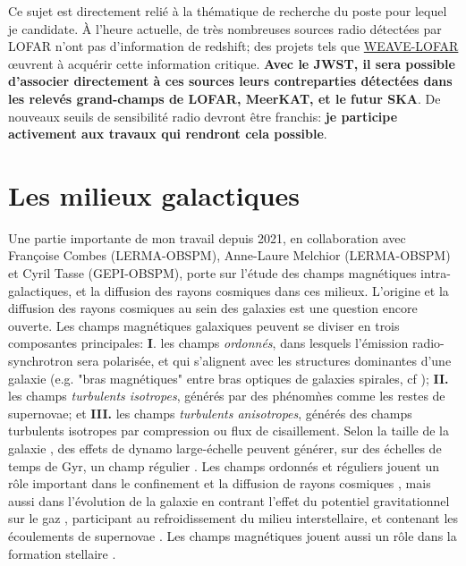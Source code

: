 \begin{tcolorbox}[colback=green!20, colframe=green!50!black, arc=3mm, boxrule=2pt]
	Ce sujet est directement reli\'e \`a la th\'ematique de recherche du poste pour lequel je candidate. \`A l'heure actuelle, de tr\`es nombreuses sources radio d\'etect\'ees par LOFAR n'ont pas d'information de redshift; des projets tels que \href{https://ingconfluence.ing.iac.es/confluence/display/WEAV/WEAVE-LOFAR}{WEAVE-LOFAR} {\oe}uvrent \`a acqu\'erir cette information critique. \textbf{Avec le JWST, il sera possible d'associer directement \`a ces sources leurs contreparties d\'etect\'ees dans les relev\'es grand-champs de LOFAR, MeerKAT, et le futur SKA}. De nouveaux seuils de sensibilit\'e radio devront \^etre franchis: \textbf{je participe activement aux travaux qui rendront cela possible}.
\end{tcolorbox}




\newpage







\section{Les milieux galactiques}

\pg
Une partie importante de mon travail depuis 2021, en collaboration avec Fran\c{c}oise Combes (LERMA-OBSPM), Anne-Laure Melchior (LERMA-OBSPM) et Cyril Tasse (GEPI-OBSPM), porte sur l'\'etude des champs magn\'etiques intra-galactiques, et la diffusion des rayons cosmiques dans ces milieux. L'origine et la diffusion des rayons cosmiques au sein des galaxies est une question encore ouverte. Les champs magn\'etiques galaxiques peuvent se diviser en trois composantes principales: \textbf{I}. les champs \textit{ordonn\'es}, dans lesquels l'\'emission radio-synchrotron sera polaris\'ee, et qui s'alignent avec les structures dominantes d'une galaxie (e.g. "bras magn\'etiques" entre bras optiques de galaxies spirales, cf \cite{1996NAWG.1996..262B}); \textbf{II. } les champs \textit{turbulents isotropes}, g\'en\'er\'es par des ph\'enom\`nes comme les restes de supernovae; et \textbf{III.} les champs \textit{turbulents anisotropes}, g\'en\'er\'es des champs turbulents isotropes par compression ou flux de cisaillement. Selon la taille de la galaxie \cite{2009A&A...494...21A}, des effets de dynamo large-\'echelle peuvent g\'en\'erer, sur des \'echelles de temps de Gyr, un champ r\'egulier \cite{1988ASSL..133.....R}. Les champs ordonn\'es et r\'eguliers jouent un r\^ole important dans le confinement et la diffusion de rayons cosmiques  \cite{2013PhPl...20e5501Z}, mais aussi dans l'\'evolution de la galaxie en contrant l'effet du potentiel gravitationnel sur le gaz \cite{1990ApJ...365..544B}, participant au refroidissement du milieu interstellaire, et contenant les \'ecoulements de supernovae \cite{2019MNRAS.488.5065E}. Les champs magn\'etiques jouent aussi un r\^ole dans la formation stellaire \cite{2019FrASS...6....7K}.

